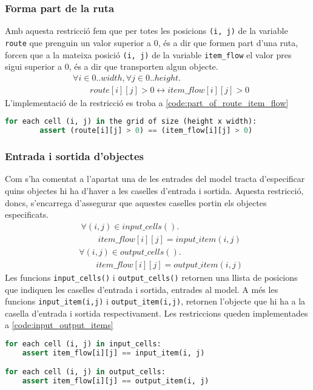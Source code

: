 \subsubsection{Forma part de la ruta} \label{subsubsec:part_of_route_object_type}
Amb aquesta restricció fem que per totes les posicions \lstinline{(i, j)} de la variable \lstinline{route} que prenguin un valor superior a 0, és a dir que formen part d'una ruta, forcen que a la mateixa posició \lstinline{(i, j)} de la variable \lstinline{item_flow} el valor pres sigui superior a 0, és a dir que transporten algun objecte.
\begin{align*}
    &\forall i \in 0..width, \forall j \in 0..height.\\
    &\qquad route[i][j]>0 \leftrightarrow item\_flow[i][j]>0
\end{align*}
L'implementació de la restricció es troba a \ref{code:part_of_route_item_flow}
\begin{lstlisting}[language=Python, caption=Part of Route, label=code:part_of_route_item_flow]
for each cell (i, j) in the grid of size (height x width):
        assert (route[i][j] > 0) == (item_flow[i][j] > 0)
\end{lstlisting}

\subsubsection{Entrada i sortida d'objectes}
Com s'ha comentat a l'apartat  una de les entrades del model tracta d'especificar quins objectes hi ha d'haver a les caselles d'entrada i sortida. Aquesta restricció, doncs, s'encarrega d'assegurar que aquestes caselles portin els objectes especificats.
\begin{align*}
    &\forall (i, j) \in input\_cells().\\
    &\qquad item\_flow[i][j] = input\_item(i, j)
\end{align*}
\begin{align*}
    &\forall (i, j) \in output\_cells().\\
    &\qquad item\_flow[i][j] = output\_item(i, j)
\end{align*}
Les funcions \lstinline{input_cells()} i \lstinline{output_cells()} retornen una llista de posicions que indiquen les caselles d'entrada i sortida, entrades al model. A més les funcions \lstinline{input_item(i,j)} i \lstinline{output_item(i,j)}, retornen l'objecte que hi ha a la casella d'entrada i sortida respectivament.
Les restriccions queden implementades a \ref{code:input_output_items}
\begin{lstlisting}[language=Python, caption=Item Input i Output, label=code:input_output_items]
for each cell (i, j) in input_cells:
    assert item_flow[i][j] == input_item(i, j)

for each cell (i, j) in output_cells:
    assert item_flow[i][j] == output_item(i, j)
\end{lstlisting}

